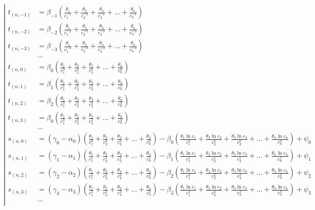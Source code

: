 \begin{equation*} \left| \begin{aligned}
t_{(n,-1)} &=
  \beta_{-1} \left(
  \frac{\theta_1}{c_1^{-1}}
+ \frac{\theta_2}{c_2^{-1}}
+ \frac{\theta_3}{c_3^{-1}}
+ \ldots
+ \frac{\theta_n}{c_n^{-1}} \right) \\
%
t_{(n,-2)} &=
  \beta_{-2} \left(
  \frac{\theta_1}{c_1^{-2}}
+ \frac{\theta_2}{c_2^{-2}}
+ \frac{\theta_3}{c_3^{-2}}
+ \ldots
+ \frac{\theta_n}{c_n^{-2}} \right) \\
%
t_{(n,-3)} &=
  \beta_{-3} \left(
  \frac{\theta_1}{c_1^{-3}}
+ \frac{\theta_2}{c_2^{-3}}
+ \frac{\theta_3}{c_3^{-3}}
+ \ldots
+ \frac{\theta_n}{c_n^{-3}} \right) \\
%
&\ldots \\
%
t_{(n,0)} &=
  \beta_0 \left(
  \frac{\theta_1}{c_1^0}
+ \frac{\theta_2}{c_2^0}
+ \frac{\theta_3}{c_3^0}
+ \ldots
+ \frac{\theta_n}{c_n^0} \right) \\
%
t_{(n,1)} &=
  \beta_1 \left(
  \frac{\theta_1}{c_1^1}
+ \frac{\theta_2}{c_2^1}
+ \frac{\theta_3}{c_3^1}
+ \ldots
+ \frac{\theta_n}{c_n^1} \right) \\
%
t_{(n,2)} &=
  \beta_2 \left(
  \frac{\theta_1}{c_1^2}
+ \frac{\theta_2}{c_2^2}
+ \frac{\theta_3}{c_3^2}
+ \ldots
+ \frac{\theta_n}{c_n^2} \right) \\
%
t_{(n,3)} &=
  \beta_0 \left(
  \frac{\theta_1}{c_1^3}
+ \frac{\theta_2}{c_2^3}
+ \frac{\theta_3}{c_3^3}
+ \ldots
+ \frac{\theta_n}{c_n^3} \right) \\
%
&\ldots \\
%
s_{(n,0)} &=
  (\gamma_0 - \alpha_0) \left(
  \frac{\theta_1}{c_1^0}
+ \frac{\theta_2}{c_2^0}
+ \frac{\theta_3}{c_3^0}
+ \ldots
+ \frac{\theta_n}{c_n^0} \right)
- \beta_0 \left(
  \frac{\theta_1 \ln{c_1}}{c_1^0}
+ \frac{\theta_2 \ln{c_2}}{c_2^0}
+ \frac{\theta_3 \ln{c_3}}{c_3^0}
+ \ldots
+ \frac{\theta_n \ln{c_n}}{c_n^0} \right)
+ \psi_0 \\
%
s_{(n,1)} &=
  (\gamma_1 - \alpha_1) \left(
  \frac{\theta_1}{c_1^1}
+ \frac{\theta_2}{c_2^1}
+ \frac{\theta_3}{c_3^1}
+ \ldots
+ \frac{\theta_n}{c_n^1} \right)
- \beta_1 \left(
  \frac{\theta_1 \ln{c_1}}{c_1^1}
+ \frac{\theta_2 \ln{c_2}}{c_2^1}
+ \frac{\theta_3 \ln{c_3}}{c_3^1}
+ \ldots
+ \frac{\theta_n \ln{c_n}}{c_n^1} \right)
+ \psi_1 \\
%
s_{(n,2)} &=
  (\gamma_2 - \alpha_2) \left(
  \frac{\theta_1}{c_1^2}
+ \frac{\theta_2}{c_2^2}
+ \frac{\theta_3}{c_3^2}
+ \ldots
+ \frac{\theta_n}{c_n^2} \right)
- \beta_2 \left(
  \frac{\theta_1 \ln{c_1}}{c_1^2}
+ \frac{\theta_2 \ln{c_2}}{c_2^2}
+ \frac{\theta_3 \ln{c_3}}{c_3^2}
+ \ldots
+ \frac{\theta_n \ln{c_n}}{c_n^2} \right)
+ \psi_2 \\
%
s_{(n,3)} &=
  (\gamma_3 - \alpha_3) \left(
  \frac{\theta_1}{c_1^3}
+ \frac{\theta_2}{c_2^3}
+ \frac{\theta_3}{c_3^3}
+ \ldots
+ \frac{\theta_n}{c_n^3} \right)
- \beta_3 \left(
  \frac{\theta_1 \ln{c_1}}{c_1^3}
+ \frac{\theta_2 \ln{c_2}}{c_2^3}
+ \frac{\theta_3 \ln{c_3}}{c_3^3}
+ \ldots
+ \frac{\theta_n \ln{c_n}}{c_n^3} \right)
+ \psi_3 \\
%
&\ldots \\
\end{aligned} \right. \end{equation*}
